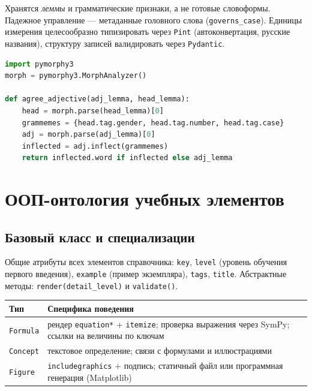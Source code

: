 \documentclass[12pt,a4paper]{article}
\begin{document}
Хранятся \emph{леммы} и грамматические признаки, а не готовые словоформы. Падежное управление --- метаданные головного слова (\texttt{governs\_case}). Единицы измерения целесообразно типизировать через \texttt{Pint} (автоконвертация, русские названия), структуру записей валидировать через \texttt{Pydantic}.

\begin{lstlisting}[language=Python,caption={Согласование прилагательного с головным словом}]
import pymorphy3
morph = pymorphy3.MorphAnalyzer()

def agree_adjective(adj_lemma, head_lemma):
    head = morph.parse(head_lemma)[0]
    grammemes = {head.tag.gender, head.tag.number, head.tag.case}
    adj = morph.parse(adj_lemma)[0]
    inflected = adj.inflect(grammemes)
    return inflected.word if inflected else adj_lemma
\end{lstlisting}

\section{ООП-онтология учебных элементов}

\subsection{Базовый класс и специализации}
Общие атрибуты всех элементов справочника: \texttt{key}, \texttt{level} (уровень обучения первого введения), \texttt{example} (пример экземпляра), \texttt{tags}, \texttt{title}. Абстрактные методы: \texttt{render(detail\_level)} и \texttt{validate()}.

\begin{center}
\begin{tabular}{@{}lp{8.6cm}@{}}
\toprule
\textbf{Тип} & \textbf{Специфика поведения} \\
\midrule
\texttt{Formula} & рендер \texttt{equation*} + \texttt{itemize}; проверка выражения через SymPy; ссылки на величины по ключам \\
\texttt{Concept} & текстовое определение; связи с формулами и иллюстрациями \\
\texttt{Figure}  & \texttt{includegraphics} + подпись; статичный файл или программная генерация (Matplotlib) \\
\bottomrule
\end{tabular}
\end{center}
\end{document}
